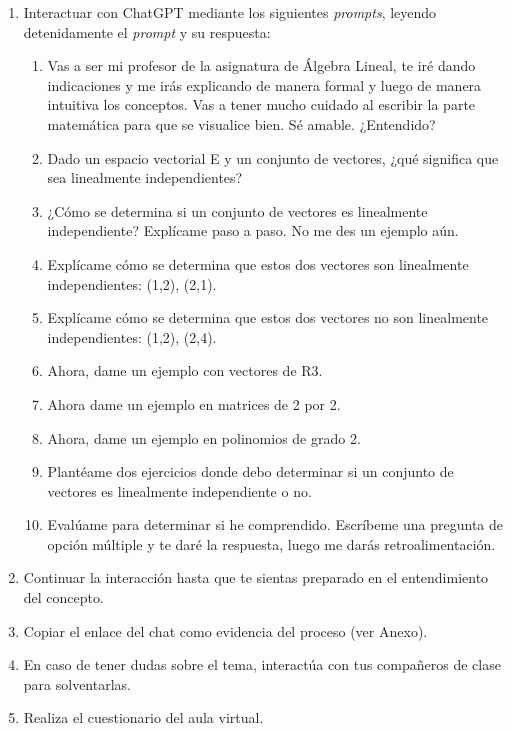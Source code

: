\documentclass[a4,11pt]{aleph-notas}
\begin{document}
\begin{enumerate}[leftmargin=*]
    \item Interactuar con ChatGPT mediante los siguientes \textit{prompts}, leyendo detenidamente el \textit{prompt} y su respuesta:
    \begin{enumerate}[label=\textit{Prompt \arabic*.},leftmargin=2.1cm]
        \item Vas a ser mi profesor de la asignatura de Álgebra Lineal, te iré dando indicaciones y me irás explicando de manera formal y luego de manera intuitiva los conceptos. Vas a tener mucho cuidado al escribir la parte matemática para que se visualice bien. Sé amable. ¿Entendido?
        \item Dado un espacio vectorial E y un conjunto de vectores, ¿qué significa que sea linealmente independientes?
        \item ¿Cómo se determina si un conjunto de vectores es linealmente independiente? Explícame paso a paso. No me des un ejemplo aún.
        \item Explícame cómo se determina que estos dos vectores son linealmente independientes: (1,2), (2,1). 
        \item Explícame cómo se determina que estos dos vectores no son linealmente independientes: (1,2), (2,4). 
        \item Ahora, dame un ejemplo con vectores de R3.
        \item Ahora dame un ejemplo en matrices de 2 por 2.
        \item Ahora, dame un ejemplo en polinomios de grado 2.
        \item Plantéame dos ejercicios donde debo determinar si un conjunto de vectores es linealmente independiente o no.
        \item Evalúame para determinar si he comprendido. Escríbeme una pregunta de opción múltiple y te daré la respuesta, luego me darás retroalimentación.
    \end{enumerate}
    \item Continuar la interacción hasta que te sientas preparado en el entendimiento del concepto.
    \item Copiar el enlace del chat como evidencia del proceso (ver Anexo).
    \item En caso de tener dudas sobre el tema, interactúa con tus compañeros de clase para solventarlas.
    \item Realiza el cuestionario del aula virtual.
\end{enumerate}
\end{document}
